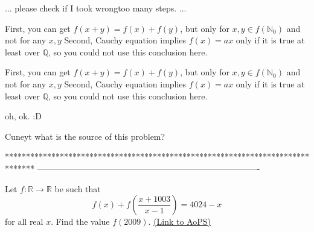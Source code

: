 \begin{solution}
	\begin{tcolorbox}... please check if I took wrong\/too many steps.  ...\end{tcolorbox}

First, you can get $ f(x+y)=f(x)+f(y)$, but only for $ x,y\in f(\mathbb N_0)$ and not for any $ x,y$
Second, Cauchy equation implies $ f(x)=ax$ only if it is true at least over $ \mathbb Q$, so you could not use this conclusion here.
\end{solution}



\begin{solution}
	\begin{tcolorbox}

First, you can get $ f(x + y) = f(x) + f(y)$, but only for $ x,y\in f(\mathbb N_0)$ and not for any $ x,y$
Second, Cauchy equation implies $ f(x) = ax$ only if it is true at least over $ \mathbb Q$, so you could not use this conclusion here.\end{tcolorbox}


oh, ok.  :D
\end{solution}



\begin{solution}
	Cuneyt what is the source of this problem?
\end{solution}
*******************************************************************************
-------------------------------------------------------------------------------

\begin{problem}
	Let $ f : \mathbb{R} \rightarrow \mathbb{R}$ be such that \[ f(x) + f\left(\dfrac{x+1003}{x-1}\right) = 4024-x\] for all real $x$. Find the value $ f(2009)$.
	\flushright \href{https://artofproblemsolving.com/community/c6h297738}{(Link to AoPS)}
\end{problem}



